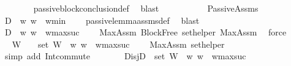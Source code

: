 \begin{isabellebody}
\ \ \ \ \ \ \isamarkupfalse%
\ passive{\isacharunderscore}{\kern0pt}block{\isacharunderscore}{\kern0pt}conclusion{\isacharunderscore}{\kern0pt}def\ \isamarkupfalse%
\ blast\ \ \ \ \ \isanewline
\ \ \ \ \isamarkupfalse%
\ PassiveAssms\ \isamarkupfalse%
\ {\isachardoublequoteopen}D{}\ {\isasyminter}\ {\isacharbraceleft}{\kern0pt}w{\isachardot}{\kern0pt}\ w\ {\isasymge}\ w{\isacharunderscore}{\kern0pt}min{\isacharbraceright}{\kern0pt}\ {\isacharequal}{\kern0pt}\ {\isacharbraceleft}{\kern0pt}{\isacharbraceright}{\kern0pt}{\isachardoublequoteclose}\ \isamarkupfalse%
\ passive{\isacharunderscore}{\kern0pt}lemma{\isacharunderscore}{\kern0pt}assms{\isacharunderscore}{\kern0pt}{}{\isacharunderscore}{\kern0pt}def\ \isamarkupfalse%
\ blast\ \ \ \isanewline
\ \ \ \ \isamarkupfalse%
\ {\isachardoublequoteopen}D{}\ {\isasyminter}\ {\isacharbraceleft}{\kern0pt}w{\isachardot}{\kern0pt}\ w\ {\isasymge}\ w{\isacharunderscore}{\kern0pt}max{\isacharunderscore}{\kern0pt}suc{\isacharbraceright}{\kern0pt}\ {\isacharequal}{\kern0pt}\ {\isacharbraceleft}{\kern0pt}{\isacharbraceright}{\kern0pt}{\isachardoublequoteclose}\ \isamarkupfalse%
\ MaxAssm\ BlockFree\ set{\isacharunderscore}{\kern0pt}helper\ MaxAssm{}\ \isamarkupfalse%
\ force\isanewline
\ \ \ \ \isamarkupfalse%
\ \isamarkupfalse%
\ {\isachardoublequoteopen}W\ {\isasymnoteq}\ {\isacharbrackleft}{\kern0pt}{\isacharbrackright}{\kern0pt}\ {\isasymLongrightarrow}\ {\isacharparenleft}{\kern0pt}set\ W{\isacharparenright}{\kern0pt}\ {\isasyminter}\ {\isacharbraceleft}{\kern0pt}w{\isachardot}{\kern0pt}\ w\ {\isasymge}\ w{\isacharunderscore}{\kern0pt}max{\isacharunderscore}{\kern0pt}suc{\isacharbraceright}{\kern0pt}\ {\isacharequal}{\kern0pt}\ {\isacharbraceleft}{\kern0pt}{\isacharbraceright}{\kern0pt}{\isachardoublequoteclose}\ \isamarkupfalse%
\ MaxAssm\ set{\isacharunderscore}{\kern0pt}helper{\isacharunderscore}{\kern0pt}{}\ \isanewline
\ \ \ \ \ \ \isamarkupfalse%
\ {\isacharparenleft}{\kern0pt}simp\ add{\isacharcolon}{\kern0pt}\ Int{\isacharunderscore}{\kern0pt}commute{\isacharparenright}{\kern0pt}\isanewline
\ \ \ \ \isamarkupfalse%
\ \isamarkupfalse%
\ Disj{\isacharcolon}{\kern0pt}{\isachardoublequoteopen}{\isacharparenleft}{\kern0pt}D{}\ {\isasymunion}\ {\isacharparenleft}{\kern0pt}set\ W{\isacharparenright}{\kern0pt}{\isacharparenright}{\kern0pt}\ {\isasyminter}\ {\isacharbraceleft}{\kern0pt}w{\isachardot}{\kern0pt}\ w\ {\isasymge}\ w{\isacharunderscore}{\kern0pt}max{\isacharunderscore}{\kern0pt}suc{\isacharbraceright}{\kern0pt}\ {\isacharequal}{\kern0pt}\ {\isacharbraceleft}{\kern0pt}{\isacharbraceright}{\kern0pt}{\isachardoublequoteclose}\isanewline

\end{isabellebody}
